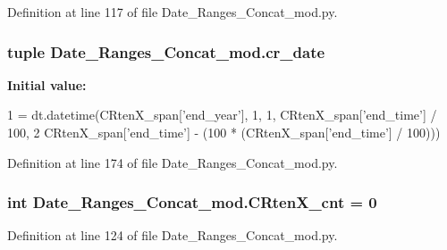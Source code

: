 Definition at line 117 of file Date\+\_\+\+Ranges\+\_\+\+Concat\+\_\+mod.\+py.

\hypertarget{namespace_date___ranges___concat__mod_a8e5a8306d6695519f7c0eb6127389f66}{}
\subsubsection[{cr\+\_\+date}]{\setlength{\rightskip}{0pt plus 5cm}tuple Date\+\_\+\+Ranges\+\_\+\+Concat\+\_\+mod.\+cr\+\_\+date}\label{namespace_date___ranges___concat__mod_a8e5a8306d6695519f7c0eb6127389f66}
{\bfseries Initial value\+:}
\begin{DoxyCode}
1 = dt.datetime(CRtenX\_span[\textcolor{stringliteral}{'end\_year'}], 1, 1, CRtenX\_span[\textcolor{stringliteral}{'end\_time'}] / 100,
2                                   CRtenX\_span[\textcolor{stringliteral}{'end\_time'}] - (100 * (CRtenX\_span[\textcolor{stringliteral}{'end\_time'}] / 100)))
\end{DoxyCode}


Definition at line 174 of file Date\+\_\+\+Ranges\+\_\+\+Concat\+\_\+mod.\+py.

\hypertarget{namespace_date___ranges___concat__mod_a6bd3cf3e30e0bbbc11bdfec9a070ef84}{}
\subsubsection[{C\+Rten\+X\+\_\+cnt}]{\setlength{\rightskip}{0pt plus 5cm}int Date\+\_\+\+Ranges\+\_\+\+Concat\+\_\+mod.\+C\+Rten\+X\+\_\+cnt = 0}\label{namespace_date___ranges___concat__mod_a6bd3cf3e30e0bbbc11bdfec9a070ef84}


Definition at line 124 of file Date\+\_\+\+Ranges\+\_\+\+Concat\+\_\+mod.\+py.

\hypertarget{namespace_date___ranges___concat__mod_a978f5d0373d453df68f135bdb1186308}{}
